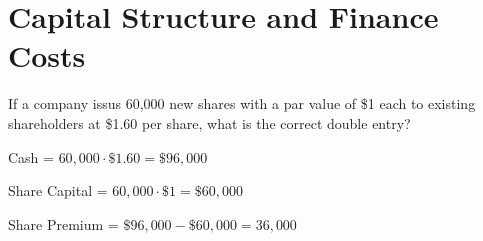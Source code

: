 \section{Capital Structure and Finance Costs}


If a company issus 60,000 new shares with a par value of \$1 each 
to existing shareholders at \$1.60 per share, what is the correct 
double entry?

Cash = $60,000 \cdot \$1.60 = \$96,000$

Share Capital = $60,000 \cdot \$1 = \$60,000$

Share Premium = $\$96,000 - \$60,000 = 36,000$

